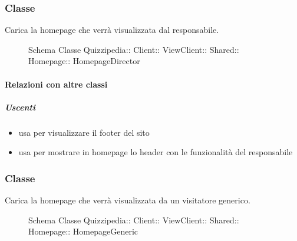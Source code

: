 \subsubsection{Classe }
Carica la homepage che verrà visualizzata dal responsabile.
\begin{figure}[H]
\centering
\noindent{}
\caption[Schema Classe HomepageDirector]{Schema Classe Quizzipedia:: Client:: ViewClient:: Shared:: Homepage:: HomepageDirector}
\end{figure}
\paragraph{Relazioni con altre classi}
\subparagraph{Uscenti}
\begin{itemize}
\item usa  per visualizzare il footer del sito
\item usa  per mostrare in homepage lo header con le funzionalità del responsabile
\end{itemize}
\subsubsection{Classe }
Carica la homepage che verrà visualizzata da un visitatore generico.
\begin{figure}[H]
\centering
\noindent{}
\caption[Schema Classe HomepageGeneric]{Schema Classe Quizzipedia:: Client:: ViewClient:: Shared:: Homepage:: HomepageGeneric}
\end{figure}
